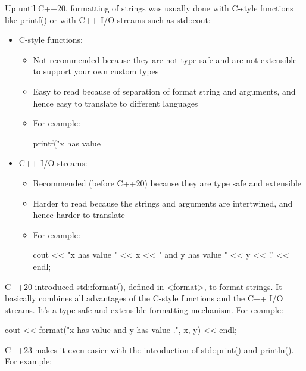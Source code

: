 
Up until C++20, formatting of strings was usually done with C-style functions like printf() or with C++ I/O streams such as std::cout:

\begin{itemize}
\item
C-style functions:

\begin{itemize}
\item
Not recommended because they are not type safe and are not extensible to support your own custom types

\item
Easy to read because of separation of format string and arguments, and hence easy to translate to different languages

\item
For example:
\begin{cpp}
    printf("x has value %
\end{cpp}
\end{itemize}

\item
C++ I/O streams:

\begin{itemize}
\item
Recommended (before C++20) because they are type safe and extensible

\item
Harder to read because the strings and arguments are intertwined, and hence harder to translate

\item
For example:
\begin{cpp}
    cout << "x has value " << x << " and y has value " << y << '.' << endl;
\end{cpp}
\end{itemize}

\end{itemize}

C++20 introduced std::format(), defined in <format>, to format strings. It basically combines all advantages of the C-style functions and the C++ I/O streams. It’s a type-safe and extensible formatting mechanism. For example:

\begin{cpp}
cout << format("x has value {} and y has value {}.", x, y) << endl;
\end{cpp}

C++23 makes it even easier with the introduction of std::print() and println(). For example:

